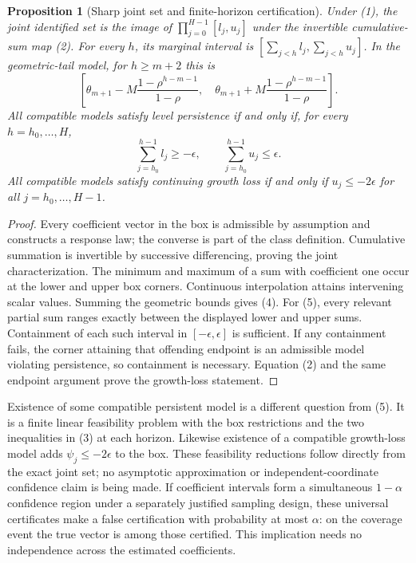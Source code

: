 \documentclass[11pt]{article}
\newtheorem{proposition}[theorem]{Proposition}
\begin{document}
\begin{proposition}[Sharp joint set and finite-horizon certification]\label{bands}
Under (1), the joint identified set is the image of
$\prod_{j=0}^{H-1}[l_j,u_j]$ under the invertible cumulative-sum map (2).
For every $h$, its marginal interval is
$[\sum_{j<h}l_j,\sum_{j<h}u_j]$. In the geometric-tail model,
for $h\geq m+2$ this is
\[
 \left[\theta_{m+1}-M\frac{1-\rho^{h-m-1}}{1-\rho},\quad
       \theta_{m+1}+M\frac{1-\rho^{h-m-1}}{1-\rho}\right].       \tag{4}
\]
All compatible models satisfy level persistence if and only if, for every
$h=h_0,\ldots,H$,
\[
 \sum_{j=h_0}^{h-1}l_j\geq-\epsilon,
 \qquad \sum_{j=h_0}^{h-1}u_j\leq\epsilon.                     \tag{5}
\]
All compatible models satisfy continuing growth loss if and only if
$u_j\leq-2\epsilon$ for all $j=h_0,\ldots,H-1$.
\end{proposition}
\begin{proof}
Every coefficient vector in the box is admissible by assumption and
constructs a response law; the converse is part of the class definition.
Cumulative summation is invertible by successive differencing, proving the
joint characterization. The minimum and maximum of a sum with coefficient
one occur at the lower and upper box corners. Continuous interpolation
attains intervening scalar values. Summing the geometric bounds gives (4).
For (5), every relevant partial sum ranges exactly between the displayed
lower and upper sums. Containment of each such interval in
$[-\epsilon,\epsilon]$ is sufficient. If any containment fails, the corner
attaining that offending endpoint is an admissible model violating
persistence, so containment is necessary. Equation (2) and the same
endpoint argument prove the growth-loss statement.
\end{proof}
Existence of some compatible persistent model is a different question from
(5). It is a finite linear feasibility problem with the box restrictions
and the two inequalities in (3) at each horizon. Likewise existence of a
compatible growth-loss model adds $\psi_j\leq-2\epsilon$ to the box.
These feasibility reductions follow directly from the exact joint set;
no asymptotic approximation or independent-coordinate confidence claim is
being made. If coefficient intervals form a simultaneous $1-\alpha$
confidence region under a separately justified sampling design, these
universal certificates make a false certification with probability at most
$\alpha$: on the coverage event the true vector is among those certified.
This implication needs no independence across the estimated coefficients.
\end{document}
